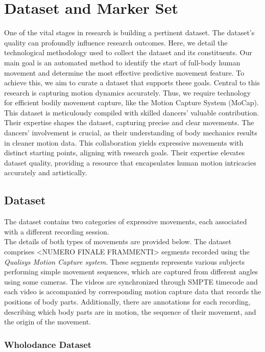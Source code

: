 \section{Dataset and Marker Set}
One of the vital stages in research is building a pertinent dataset.
The dataset's quality can profoundly influence research outcomes. Here, we detail the technological methodology used to collect the dataset and its constituents.
Our main goal is an automated method to identify the start of full-body human movement and determine the most effective predictive movement feature.
To achieve this, we aim to curate a dataset that supports these goals.
Central to this research is capturing motion dynamics accurately.
Thus, we require technology for efficient bodily movement capture, like the Motion Capture System (MoCap).
This dataset is meticulously compiled with skilled dancers' valuable contribution.
Their expertise shapes the dataset, capturing precise and clear movements.
The dancers' involvement is crucial, as their understanding of body mechanics results in cleaner motion data.
This collaboration yields expressive movements with distinct starting points, aligning with research goals.
Their expertise elevates dataset quality, providing a resource that encapsulates human motion intricacies accurately and artistically.


\subsection{Dataset}
The dataset contains two categories of expressive movements, each associated with a different recording session. \\
The details of both types of movements are provided below.
The dataset comprises <NUMERO FINALE FRAMMENTI> segments recorded using the \textit{Qualisys Motion Capture system}.
These segments represents various subjects performing simple movement sequences, which are captured from different angles using some cameras.
The videos are synchronized through SMPTE timecode and each video is accompanied by corresponding motion capture data that records the positions of body parts.
Additionally, there are annotations for each recording, describing which body parts are in motion, the sequence of their movement, and the origin of the movement.



\subsubsection{Wholodance Dataset}
